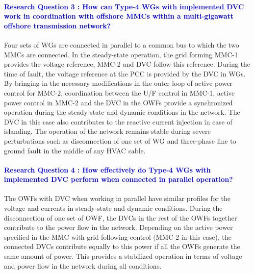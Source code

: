 \paragraph{\textcolor{blue}{Research Question 3 : How can Type-4 \gls{WG}s with implemented \gls{DVC} work in coordination with offshore \gls{MMC}s within a multi-gigawatt offshore transmission network?}}

\paragraph{} Four sets of \gls{WG}s are connected in parallel to a common bus to which the two \gls{MMC}s are connected. In the steady-state operation, the grid forming \gls{MMC}-1 provides the voltage reference, \gls{MMC}-2 and \gls{DVC} follow this reference. During the time of fault, the voltage reference at the \gls{PCC} is provided by the \gls{DVC} in \gls{WG}s. By bringing in the necessary modifications in the outer loop of active power control for \gls{MMC}-2, coordination between the U/F control in \gls{MMC}-1, active power control in \gls{MMC}-2 and the \gls{DVC} in the \gls{OWF}s provide a synchronized operation during the steady state and dynamic conditions in the network. The \gls{DVC} in this case also contributes to the reactive current injection in case of islanding. The operation of the network remains stable during severe perturbations such as disconnection of one set of \gls{WG} and three-phase line to ground fault in the middle of any \gls{HVAC} cable.

\paragraph{\textcolor{blue}{Research Question 4 : How effectively do Type-4 \gls{WG}s with implemented \gls{DVC} perform when connected in parallel operation?}}

\paragraph{} The \gls{OWF}s with \gls{DVC} when working in parallel have similar profiles for the voltage and currents in steady-state and dynamic conditions. During the disconnection of one set of \gls{OWF}, the \gls{DVC}s in the rest of the \gls{OWF}s together contribute to the power flow in the network. Depending on the active power specified in the \gls{MMC} with grid following control (\gls{MMC}-2 in this case), the connected \gls{DVC}s contribute equally to this power if all the \gls{OWF}s generate the same amount of power. This provides a stabilized operation in terms of voltage and power flow in the network during all conditions.  

